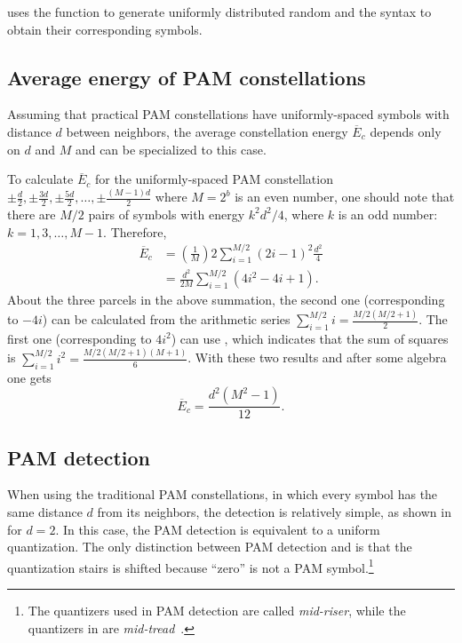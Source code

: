 uses the function  to generate uniformly distributed random  and the syntax  to obtain their corresponding symbols.

\subsection{Average energy of PAM constellations}
Assuming that practical PAM constellations have uniformly-spaced symbols with distance $d$
between neighbors, the average constellation energy $\overline E_c$ depends only on $d$ and $M$ and  can be specialized to this case.

To calculate $\overline E_c$ for the uniformly-spaced PAM constellation $\pm \frac{d}{2}, \pm \frac{3d}{2}, \pm \frac{5d}{2}, \ldots, \pm \frac{(M-1)d}{2}$ where $M=2^b$ is an even number, one should note that there are $M/2$ pairs of symbols with energy $k^2 d^2/4$, where $k$ is an odd number: $k=1,3,\ldots,M-1$. Therefore,
\begin{align}
\overline E_c &= \left(\frac{1}{M}\right) 2 \sum_{i=1}^{M/2} (2i-1)^2 \frac{d^2}{4} \nonumber \\
&= \frac{d^2}{2M} \sum_{i=1}^{M/2} (4i^2 - 4i + 1) \nonumber.
\end{align}
About the three parcels in the above summation, the second one (corresponding to $-4i$) can be calculated from the arithmetic series $\sum_{i=1}^{M/2} i = \frac{M/2(M/2+1)}{2}$. The first one (corresponding to $4i^2$) can use , which indicates that the sum of squares is $\sum_{i=1}^{M/2} i^2 = \frac{M/2(M/2+1)(M+1)}{6}$. With these two results and after some algebra one gets
\begin{equation}
\overline E_c = \frac{d^2 (M^2 - 1)}{12}.
\label{eq:pamConstellationEnergy}
\end{equation}

\subsection{PAM detection}

When using the traditional PAM constellations, in which every symbol has the same distance $d$ from its neighbors, the detection is relatively simple, as shown in  for $d = 2$.
In this case, the PAM detection is equivalent to a uniform quantization. The only distinction between PAM detection and  is that the quantization stairs is shifted because ``zero'' is not a PAM symbol.\footnote{The quantizers used in PAM detection are called \emph{mid-riser}, while the quantizers in  are \emph{mid-tread}~\cite{Jayant84}.}

